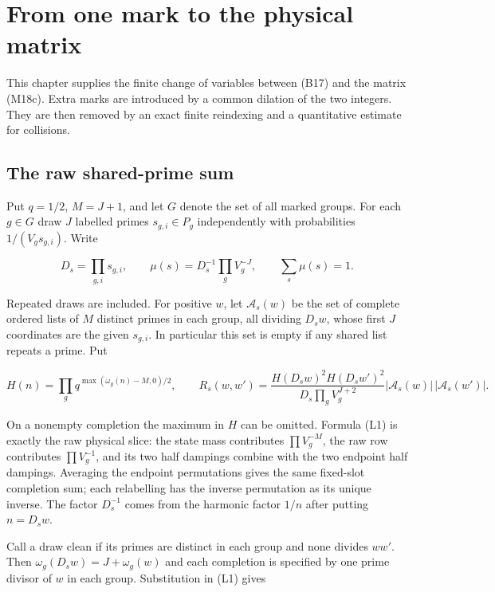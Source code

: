 \hypertarget{physical-lift}{%
\section{From one mark to the physical matrix}\label{physical-lift}}

This chapter supplies the finite change of variables between (B17) and
the matrix (M18c). Extra marks are introduced by a common dilation of
the two integers. They are then removed by an exact finite reindexing
and a quantitative estimate for collisions.


\hypertarget{physical-lift-the-raw-shared-prime-sum}{%
\subsection{The raw shared-prime
sum}\label{physical-lift-the-raw-shared-prime-sum}}

Put \(q=1/2\), \(M=J+1\), and let \(G\) denote the set of all marked
groups. For each \(g\in G\) draw \(J\) labelled primes
\(s_{g,i}\in P_g\) independently with probabilities \(1/(V_gs_{g,i})\).
Write

\[
D_s=\prod_{g,i}s_{g,i},\qquad
\mu(s)=D_s^{-1}\prod_gV_g^{-J},\qquad \sum_s\mu(s)=1.
\]

Repeated draws are included. For positive \(w\), let \(\mathcal A_s(w)\)
be the set of complete ordered lists of \(M\) distinct primes in each
group, all dividing \(D_sw\), whose first \(J\) coordinates are the
given \(s_{g,i}\). In particular this set is empty if any shared list
repeats a prime. Put

\[
H(n)=\prod_g q^{\max(\omega_g(n)-M,0)/2},
\qquad
R_s(w,w')=
\frac{H(D_sw)^2H(D_sw')^2}{D_s\prod_gV_g^{J+2}}
 |\mathcal A_s(w)|\,|\mathcal A_s(w')|. \tag{L1}
\]

On a nonempty completion the maximum in \(H\) can be omitted. Formula
(L1) is exactly the raw physical slice: the state mass contributes
\(\prod V_g^{-M}\), the raw row contributes \(\prod V_g^{-1}\), and its
two half dampings combine with the two endpoint half dampings. Averaging
the endpoint permutations gives the same fixed-slot completion sum; each
relabelling has the inverse permutation as its unique inverse. The
factor \(D_s^{-1}\) comes from the harmonic factor \(1/n\) after putting
\(n=D_sw\).

Call a draw clean if its primes are distinct in each group and none
divides \(ww'\). Then \(\omega_g(D_sw)=J+\omega_g(w)\) and each
completion is specified by one prime divisor of \(w\) in each group.
Substitution in (L1) gives

